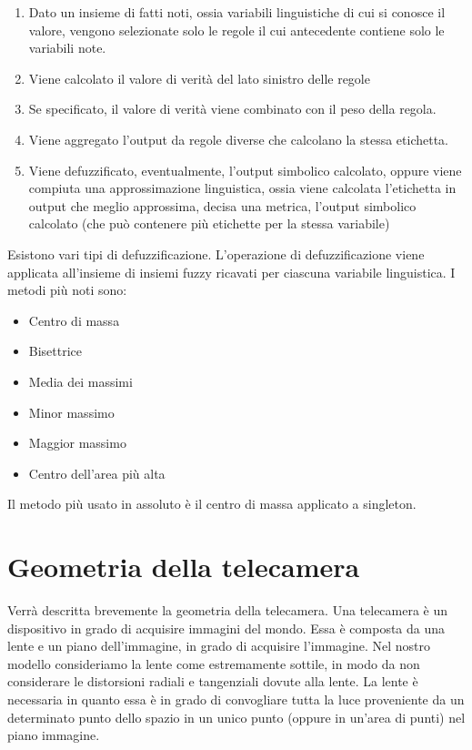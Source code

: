 \begin{enumerate}
 \item Dato un insieme di fatti noti, ossia variabili linguistiche di cui si conosce il valore, vengono selezionate solo le regole il cui antecedente contiene solo le variabili note.
 \item Viene calcolato il valore di verità del lato sinistro delle regole
 \item Se specificato, il valore di verità viene combinato con il peso della regola.
 \item Viene aggregato l'output da regole diverse che calcolano la stessa etichetta.
 \item Viene defuzzificato, eventualmente, l'output simbolico calcolato, oppure viene compiuta una approssimazione linguistica, ossia viene calcolata l'etichetta in output che meglio approssima, decisa una metrica, l'output simbolico calcolato (che può contenere più etichette per la stessa variabile)
\end{enumerate}

Esistono vari tipi di defuzzificazione. L'operazione di defuzzificazione viene applicata all'insieme di insiemi fuzzy ricavati per ciascuna variabile linguistica. I metodi più noti sono:
\begin{itemize}
 \item Centro di massa
 \item Bisettrice
 \item Media dei massimi
 \item Minor massimo
 \item Maggior massimo
 \item Centro dell'area più alta
\end{itemize}

Il metodo più usato in assoluto è il centro di massa applicato a singleton.

\section{Geometria della telecamera}

Verrà descritta brevemente la geometria della telecamera.
Una telecamera è un dispositivo in grado di acquisire immagini del mondo. Essa è composta da una lente e un piano dell'immagine, in grado di acquisire l'immagine. Nel nostro modello consideriamo la lente come estremamente sottile, in modo da non considerare le distorsioni radiali e tangenziali dovute alla lente. La lente è necessaria in quanto essa è in grado di convogliare tutta la luce proveniente da un determinato punto dello spazio in un unico punto (oppure in un'area di punti) nel piano immagine.

